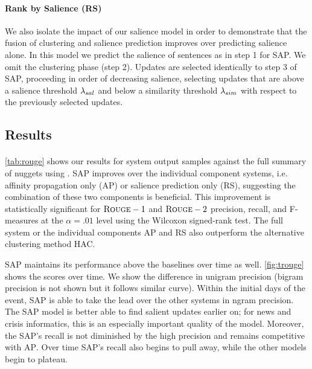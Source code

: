 \paragraph{Rank by Salience (RS)} We also isolate the impact of our salience
model in order to demonstrate that the fusion of clustering and salience
prediction improves over predicting salience alone. In this model we predict
the salience of sentences as in step 1 for SAP. We omit the clustering phase
(step 2).  Updates are selected identically to step 3 of SAP, proceeding in
order of decreasing salience, selecting updates that are above a salience
threshold ${\lambda_{sal}}$ and below a similarity threshold ${\lambda_{sim}}$ with respect
to the previously selected updates.

\subsection{Results}




\paragraph{\rouge} 
\autoref{tab:rouge} shows our results for system output samples against the
full summary of nuggets using \rouge. SAP improves over the individual
component systems, i.e. affinity propagation only (AP) or salience prediction
only (RS), suggesting the combination of these two components is beneficial.
This improvement is statistically significant for $\textsc{Rouge}-1$ and $\textsc{Rouge}-2$
precision, recall, and F-measures at the $\alpha = .01$ level using the
Wilcoxon signed-rank test.  The full system or the individual components AP and
RS also outperform the alternative clustering method HAC. 

SAP maintains its performance above the baselines over time as well.
\autoref{fig:trouge} shows the  scores over time. We show the
difference in unigram precision (bigram precision is not shown but it follows
similar curve). Within the initial days of the event, SAP is able to take the
lead over the other systems in ngram precision. The SAP model is better able to
find salient updates earlier on; for news and crisis informatics, this is an
especially important quality of the model.  Moreover, the SAP's recall is not
diminished by the high precision and remains competitive with \textsc{AP}.
Over time SAP's recall also begins to pull away, while the other models begin
to plateau.

